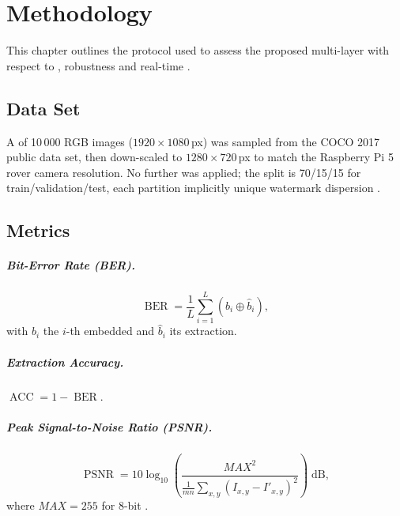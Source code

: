 \chapter{Methodology}
\label{ch:methodology}

This chapter outlines the  protocol used to assess the
proposed multi-layer  with respect to ,
robustness and real-time .

\section{Data Set}
\label{sec:method:dataset}

A  of 10\,000 RGB images ($1920\times1080$\,px) was sampled from
the COCO 2017 public data set, then down-scaled to
$1280\times720$\,px to match the Raspberry Pi 5 rover camera resolution.
No further  was applied; the split is 70/15/15 for
train/validation/test, each partition implicitly  unique watermark dispersion .

\section{Metrics}
\label{sec:method:metrics}

\paragraph{Bit-Error Rate (BER).}
\[
    \operatorname{BER}= \frac1L\sum_{i=1}^{L} (b_i \oplus \hat b_i),
\]
with $b_i$ the $i$-th embedded  and $\hat b_i$ its extraction.

\paragraph{Extraction Accuracy.}  $\operatorname{ACC}=1-\operatorname{BER}$.

\paragraph{Peak Signal-to-Noise Ratio (PSNR).}
\[
    \operatorname{PSNR}=10 \log_{10}\!
    \left(\frac{\mathit{MAX}^2}{\frac1{mn}\sum_{x,y}(I_{x,y}-I'_{x,y})^{2}}\right)
    \;\text{dB},
\]
where $\mathit{MAX}=255$ for 8-bit .

